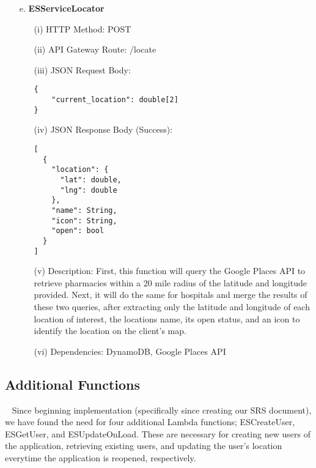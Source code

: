 \documentclass[10pt, a4paper]{article}
\begin{document}
\begin{enumerate}
	\item[e.] \textbf{ESServiceLocator}
		\begin{itemize}		
		\item[(i)] HTTP Method: POST
		\item[(ii)] API Gateway Route: /locate
		\item[(iii)] JSON Request Body:
			\begin{lstlisting}
{
    "current_location": double[2]   
}
			\end{lstlisting}
		\item[(iv)] JSON Response Body (Success):
			\begin{lstlisting}
[
  {
    "location": {
      "lat": double,
      "lng": double
    },
    "name": String,
    "icon": String,
    "open": bool
  }
]
			\end{lstlisting}
		\item[(v)] Description: First, this function will query the Google Places API to retrieve pharmacies within a 20 mile radius of the latitude and longitude provided. Next, it will do the same for hospitals and merge the results of these two queries, after extracting only the latitude and longitude of each location of interest, the locations name, its open status, and an icon to identify the location on the client's map. 
		\item[(vi)] Dependencies: DynamoDB, Google Places API
		\end{itemize}
	\end{enumerate}

\subsection{Additional Functions}
\par ~ Since beginning implementation (specifically since creating our SRS document), we have found the need for four additional Lambda functions; ESCreateUser, ESGetUser, and ESUpdateOnLoad. These are necessary for creating new users of the application, retrieving existing users, and updating the user's location everytime the application is reopened, respectively. 
\end{document}
